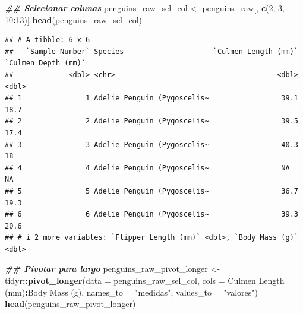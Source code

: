 \documentclass[
]{article}
\newenvironment{Shaded}{\begin{snugshade}}{\end{snugshade}}
\newcommand{\AttributeTok}[1]{\textcolor[rgb]{0.13,0.29,0.53}{#1}}
\newcommand{\DecValTok}[1]{\textcolor[rgb]{0.00,0.00,0.81}{#1}}
\newcommand{\DocumentationTok}[1]{\textcolor[rgb]{0.56,0.35,0.01}{\textbf{\textit{#1}}}}
\newcommand{\FunctionTok}[1]{\textcolor[rgb]{0.13,0.29,0.53}{\textbf{#1}}}
\newcommand{\NormalTok}[1]{#1}
\newcommand{\OtherTok}[1]{\textcolor[rgb]{0.56,0.35,0.01}{#1}}
\newcommand{\SpecialCharTok}[1]{\textcolor[rgb]{0.81,0.36,0.00}{\textbf{#1}}}
\newcommand{\StringTok}[1]{\textcolor[rgb]{0.31,0.60,0.02}{#1}}
\begin{document}
\begin{Shaded}
\begin{Highlighting}[]
\DocumentationTok{\#\# Selecionar colunas}
\NormalTok{penguins\_raw\_sel\_col }\OtherTok{\textless{}{-}}\NormalTok{ penguins\_raw[, }\FunctionTok{c}\NormalTok{(}\DecValTok{2}\NormalTok{, }\DecValTok{3}\NormalTok{, }\DecValTok{10}\SpecialCharTok{:}\DecValTok{13}\NormalTok{)]}
\FunctionTok{head}\NormalTok{(penguins\_raw\_sel\_col)}
\end{Highlighting}
\end{Shaded}

\begin{verbatim}
## # A tibble: 6 x 6
##   `Sample Number` Species                     `Culmen Length (mm)` `Culmen Depth (mm)`
##             <dbl> <chr>                                      <dbl>               <dbl>
## 1               1 Adelie Penguin (Pygoscelis~                 39.1                18.7
## 2               2 Adelie Penguin (Pygoscelis~                 39.5                17.4
## 3               3 Adelie Penguin (Pygoscelis~                 40.3                18  
## 4               4 Adelie Penguin (Pygoscelis~                 NA                  NA  
## 5               5 Adelie Penguin (Pygoscelis~                 36.7                19.3
## 6               6 Adelie Penguin (Pygoscelis~                 39.3                20.6
## # i 2 more variables: `Flipper Length (mm)` <dbl>, `Body Mass (g)` <dbl>
\end{verbatim}

\begin{Shaded}
\begin{Highlighting}[]
\DocumentationTok{\#\# Pivotar para largo}
\NormalTok{penguins\_raw\_pivot\_longer }\OtherTok{\textless{}{-}}\NormalTok{ tidyr}\SpecialCharTok{::}\FunctionTok{pivot\_longer}\NormalTok{(}\AttributeTok{data =}\NormalTok{ penguins\_raw\_sel\_col, }
                                                 \AttributeTok{cols =} \StringTok{\textasciigrave{}}\AttributeTok{Culmen Length (mm)}\StringTok{\textasciigrave{}}\SpecialCharTok{:}\StringTok{\textasciigrave{}}\AttributeTok{Body Mass (g)}\StringTok{\textasciigrave{}}\NormalTok{,}
                                                 \AttributeTok{names\_to =} \StringTok{"medidas"}\NormalTok{, }
                                                 \AttributeTok{values\_to =} \StringTok{"valores"}\NormalTok{)}
\FunctionTok{head}\NormalTok{(penguins\_raw\_pivot\_longer)}
\end{Highlighting}
\end{Shaded}
\end{document}
